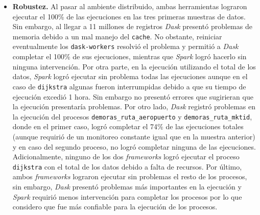 \begin{itemize}
	
	\item \textbf{Robustez.} Al pasar al ambiente distribuido, ambas herramientas lograron ejecutar el 100\% de las ejecuciones en las tres primeras muestras de datos. Sin embargo, al llegar a 11 millones de registros \textit{Dask} presentó problemas de memoria debido a un mal manejo del \texttt{cache}. No obstante, reiniciar eventualmente los \texttt{dask-workers} resolvió el problema y permitió a \textit{Dask} completar el 100\% de sus ejecuciones, mientras que \textit{Spark} logró hacerlo sin ninguna intervención. Por otra parte, en la ejecución utilizando el total de los datos, \textit{Spark} logró ejecutar sin problema todas las ejecuciones aunque en el caso de \texttt{dijkstra} algunas fueron interrumpidas debido a que su tiempo de ejecución excedió 1 hora. Sin embargo no presentó errores que sugirieran que la ejecución presentaría problemas. Por otro lado, \textit{Dask} registró problemas en la ejecución del procesos \texttt{demoras\_ruta\_aeropuerto} y \texttt{demoras\_ruta\_mktid}, donde en el primer caso, logró completar el 74\% de las ejecuciones totales (aunque requirió de un monitoreo constante igual que en la muestra anterior) y en caso del segundo proceso, no logró completar ninguna de las ejecuciones. Adicionalmente, ninguno de los dos \textit{frameworks} logró ejecutar el proceso \texttt{dijkstra} con el total de los datos debido a falta de recursos. Por último, ambos \textit{frameworks} lograron ejecutar sin problemas el resto de los procesos, sin embargo, \textit{Dask} presentó problemas más importantes en la ejecución y \textit{Spark} requirió menos intervención para completar los procesos por lo que considero que fue más confiable para la ejecución de los procesos.
	

\end{itemize}
